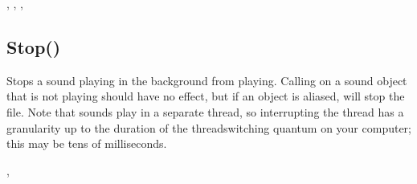 \documentclass[letterpaper,10pt,english]{sphinxmanual}
\begin{document}
\sphinxAtStartPar
{}

\sphinxAtStartPar
{}, , , 

\ignorespaces 

\subsection{Stop()}
\label{\detokenize{reference/peblobjects:stop}}\label{\detokenize{reference/peblobjects:index-59}}
\sphinxAtStartPar
{}

\sphinxAtStartPar
{}

\sphinxAtStartPar
Stops a sound playing in the background from   playing.  Calling  on a sound object that is not   playing should have no effect, but if an object is aliased,    will stop the file.  Note that sounds play in a   separate thread, so interrupting the thread has a granularity up to   the duration of the thread\sphinxhyphen{}switching quantum on your computer; this   may be tens of milliseconds.

\sphinxAtStartPar
{}

\begin{sphinxVerbatim}[commandchars=\\\{\}]
\end{sphinxVerbatim}

\sphinxAtStartPar
{}

\begin{sphinxVerbatim}[commandchars=\\\{\}]
\end{sphinxVerbatim}

\sphinxAtStartPar
{}

\sphinxAtStartPar
{}, 
\end{document}
